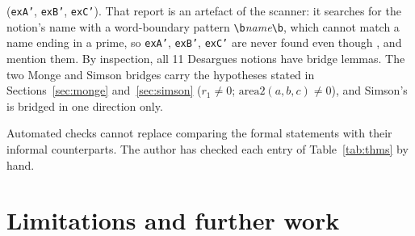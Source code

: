 \documentclass[11pt]{article}
\theoremstyle{definition}
\theoremstyle{remark}
\newcommand{\lean}[1]{\texttt{#1}}
\begin{document}
\begin{itemize}
(\lean{exA'}, \lean{exB'}, \lean{exC'}). That report is an artefact of the scanner: it searches
for the notion's name with a word-boundary pattern \lean{\textbackslash b}\emph{name}\lean{\textbackslash b},
which cannot match a name ending in a prime, so \lean{exA'}, \lean{exB'}, \lean{exC'} are never
found even though ,  and
 mention them. By inspection, all 11 Desargues notions have
bridge lemmas. The two Monge and Simson bridges carry the hypotheses stated in
Sections~\ref{sec:monge} and~\ref{sec:simson} ($r_1\ne0$; $\mathrm{area2}(a,b,c)\ne0$), and
Simson's  is bridged in one direction only.
\end{itemize}
Automated checks cannot replace comparing the formal statements with their informal counterparts.
The author has checked each entry of Table~\ref{tab:thms} by hand.

\section{Limitations and further work}\label{sec:limits}
\end{document}
